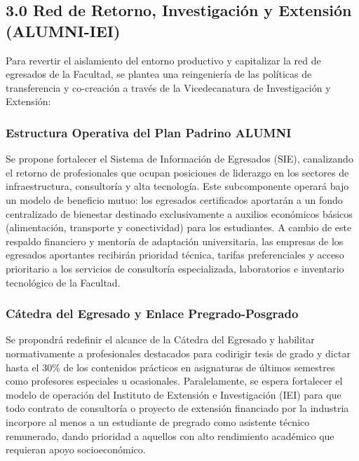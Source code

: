 \documentclass[journal,10pt,twocolumn,letterpaper]{IEEEtran}
\begin{document}
\subsection{3.0 Red de Retorno, Investigación y Extensión (ALUMNI-IEI)}
Para revertir el aislamiento del entorno productivo y capitalizar la red de egresados de la Facultad, se plantea una reingeniería de las políticas de transferencia y co-creación a través de la Vicedecanatura de Investigación y Extensión:

\subsubsection{Estructura Operativa del Plan Padrino ALUMNI}
Se propone fortalecer el Sistema de Información de Egresados (SIE), canalizando el retorno de profesionales que ocupan posiciones de liderazgo en los sectores de infraestructura, consultoría y alta tecnología. Este subcomponente operará bajo un modelo de beneficio mutuo: los egresados certificados aportarán a un fondo centralizado de bienestar destinado exclusivamente a auxilios económicos básicos (alimentación, transporte y conectividad) para los estudiantes. A cambio de este respaldo financiero y mentoría de adaptación universitaria, las empresas de los egresados aportantes recibirán prioridad técnica, tarifas preferenciales y acceso prioritario a los servicios de consultoría especializada, laboratorios e inventario tecnológico de la Facultad.

\subsubsection{Cátedra del Egresado y Enlace Pregrado-Posgrado}
Se propondrá redefinir el alcance de la Cátedra del Egresado y habilitar normativamente a profesionales destacados para codirigir tesis de grado y dictar hasta el 30\% de los contenidos prácticos en asignaturas de últimos semestres como profesores especiales u ocasionales. Paralelamente, se espera fortalecer el modelo de operación del Instituto de Extensión e Investigación (IEI) para que todo contrato de consultoría o proyecto de extensión financiado por la industria incorpore al menos a un estudiante de pregrado como asistente técnico remunerado, dando prioridad a aquellos con alto rendimiento académico que requieran apoyo socioeconómico.
\end{document}

